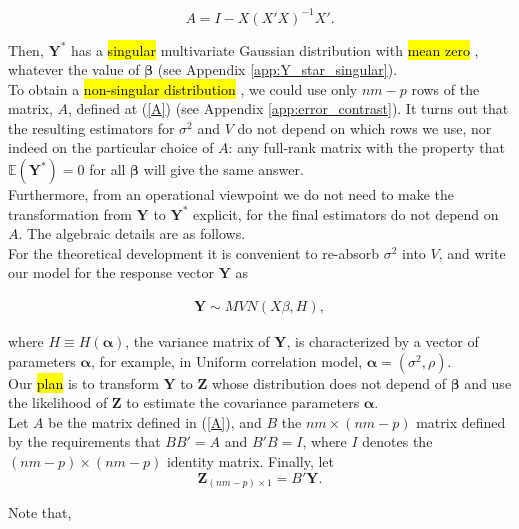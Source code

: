 \documentclass[11pt, a4paper]{article}
\newcommand{\bs}[1]{\boldsymbol{#1}}
\newcommand{\yhl}[1]{%
    {\sethlcolor{yellow}\hl{#1}}%
}
\begin{document}
\begin{equation}\label{A}
A = I - X(X'X)^{-1}X'.
\end{equation}

Then, $\bs{Y}^{*}$ has a \yhl{singular} multivariate Gaussian distribution with \yhl{mean zero}, whatever the value of $\bs{\beta}$ (see Appendix \ref{app:Y_star_singular}). \\[0.5em]

To obtain a \yhl{non-singular distribution}, we could use only $nm - p$ rows of the matrix, $A$, defined at (\ref{A}) (see Appendix \ref{app:error_contrast}). It turns out that the resulting estimators for $\sigma^2$ and $V$ do not depend on which rows we use, nor indeed on the particular choice of $A$: any full-rank matrix with the property that $\mathbb{E}(\bs{Y}^{*}) = 0$ for all $\bs{\beta}$ will give the same answer. \\[0.5em]

Furthermore, from an operational viewpoint we do not need to make the transformation from $\bs{Y}$ to $\bs{Y}^{*}$ explicit, for the final estimators do not depend on $A$. The algebraic details are as follows. \\[0.5em]

For the theoretical development it is convenient to re-absorb $\sigma^2$ into $V$, and write our model for the response vector $\bs{Y}$ as

\begin{align}\label{distribution_of_Y_general}
\bs{Y} \sim MVN(X\beta, H),
\end{align}

where $H \equiv H(\bs{\alpha})$, the variance matrix of $\bs{Y}$, is characterized by a vector of parameters $\bs{\alpha}$, for example, in Uniform correlation model, $\bs{\alpha} = (\sigma^2, \rho)$. \\[0.5em]

Our \yhl{plan} is to transform $\bs{Y}$ to $\bs{Z}$ whose distribution does not depend of $\bs{\beta}$ and use the likelihood of $\bs{Z}$ to estimate the covariance parameters $\bs{\alpha}$. \\[0.5em]

Let $A$ be the matrix defined in (\ref{A}), and $B$ the $nm \times (nm - p)$ matrix defined by the requirements that $BB' = A$ and $B'B = I$, where $I$ denotes the $(nm - p) \times (nm - p)$ identity matrix. Finally, let
\[
\bs{Z}_{(nm - p) \times 1} = B'\bs{Y}.
\]

Note that,
\end{document}

